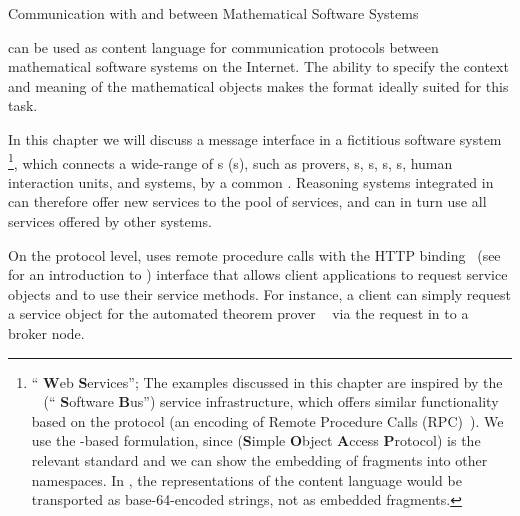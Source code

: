 
\begin{tchapter}[id=rpc,short=Communication between Systems]{Communication with and between Mathematical Software Systems}

{\omdoc} can be used as content language for communication protocols between
mathematical software systems on the Internet. The ability to specify the context
and meaning of the mathematical objects makes the {\omdoc} format ideally suited
for this task.

In this chapter we will discuss a message interface in a fictitious software system
{\mathwebws}\footnote{``{\mathweb} {\bf{W}}eb {\bf{S}}ervices''; The examples discussed in
  this chapter are inspired by the {\mathwebsb}~\cite{FraKoh:mabdl99,ZimKoh:tmsbdmr02}
  (``{\mathweb} {\bf{S}}oftware {\bf{B}}us'') service infrastructure, which offers similar
  functionality based on the {\xmlrpc} protocol (an {\xml} encoding of Remote Procedure
  Calls (RPC)~\cite{xmlrpc}). We use the {\soap}-based formulation, since {\soap}
  ({\bf{S}}imple {\bf{O}}bject {\bf{A}}ccess {\bf{P}}rotocol) is the relevant
  {} standard and we can show the embedding of {\omdoc} fragments into other
  {\xml} namespaces. In {\xmlrpc}, the {\xml} representations of the content language
  {\omdoc} would be transported as base-64-encoded strings, not as embedded {\xml}
  fragments. }, which connects a wide-range of {s}
({s}), such as { {prover}s},
{s}, {s},
{s}, {s}, human interaction units,
and { {system}s}, by a common
{}.  Reasoning systems integrated in {\mathwebws} can
therefore offer new services to the pool of services, and can in turn use all services
offered by other systems.

On the protocol level, {\mathwebws} uses {\soap} remote procedure calls with the HTTP
binding~\cite{GudHad:soapad03} (see~\cite{Mitra:soapPrimer03} for an introduction to
{\soap}) interface that allows client applications to request service objects and to use
their service methods. For instance, a client can simply request a service object for the
automated theorem prover {\spass}~\cite{Weidenbach:sv97} via the {\http} {}
request in {} to a {\mathwebws} broker node.


\end{tchapter}
